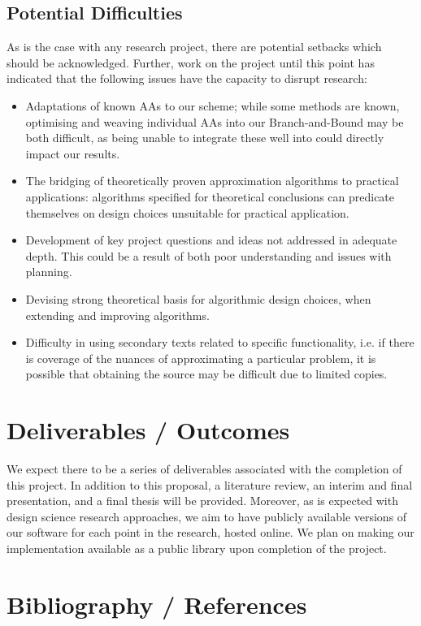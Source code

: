 \documentclass[12pt, a4paper]{article}
\begin{document}
\subsection{Potential Difficulties}
As is the case with any research project, there are potential setbacks which should be acknowledged. Further, work on the project until this point has indicated that the following issues have the capacity to disrupt research:
\begin{itemize}
  \item Adaptations of known AAs to our scheme; while some methods are known, optimising and weaving individual AAs into our Branch-and-Bound may be both difficult, as being unable to integrate these well into could directly impact our results.
  \item The bridging of theoretically proven approximation algorithms to practical applications: algorithms specified for theoretical conclusions can predicate themselves on design choices unsuitable for practical application.
  \item Development of key project questions and ideas not addressed in adequate depth. This could be a result of both poor understanding and issues with planning.
  \item Devising strong theoretical basis for algorithmic design choices, when extending and improving algorithms.
  \item Difficulty in using secondary texts related to specific functionality, i.e. if there is coverage of the nuances of approximating a particular problem, it is possible that obtaining the source may be difficult due to limited copies.
\end{itemize}

\section{Deliverables / Outcomes}
We expect there to be a series of deliverables associated with the completion of this project. In addition to this proposal, a literature review, an interim and final presentation, and a final thesis will be provided. Moreover, as is expected with design science research approaches, we aim to have publicly available versions of our software for each point in the research, hosted online. We plan on making our implementation available as a public library upon completion of the project. 

\section{Bibliography / References}


\end{document}
